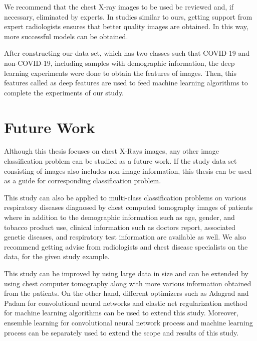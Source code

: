 We recommend that the chest X-ray images to be used be reviewed and, if necessary, eliminated by experts. In studies similar to ours, getting support from expert radiologists ensures that better quality images are obtained. In this way, more successful models can be obtained.

After constructing our data set, which has two classes such that COVID-19 and non-COVID-19, including samples with demographic information, the deep learning experiments were done to obtain the features of images. Then, this features called as deep features are used to feed machine learning algorithms to complete the experiments of our study.

\newpage

\section{Future Work}

Although this thesis focuses on chest X-Rays images, any other image classification problem can be studied as a future work. If the study data set consisting of images also includes non-image information, this thesis can be used as a guide for corresponding classification problem.

This study can also be applied to multi-class classification problems on various respiratory diseases diagnosed by chest computed tomography images of patients where in addition to the demographic information such as age, gender, and tobacco product use, clinical information such as doctors report,  associated genetic diseases, and respiratory test information are available as well. We also recommend getting advise from radiologists and chest disease specialists on the data, for the given study example.

This study can be improved by using large data in size and can be extended by using chest computer tomography along with more various information obtained from the patients. On the other hand, different optimizers such as Adagrad \cite{adagrad} and Padam \cite{padam} for convolutional neural networks and elastic net regularization method \cite{elasticnet_paper} for machine learning algorithms can be used to extend this study. Moreover, ensemble learning \cite{ensemble_learning} for convolutional neural network process and machine learning process can be separately used to extend the scope and results of this study.